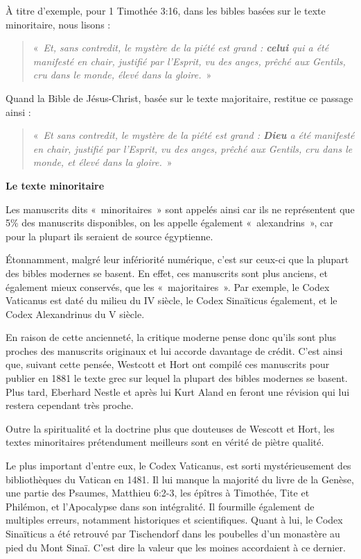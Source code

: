 \begin{small}
À titre d'exemple, pour 1 Timothée 3:16, dans les bibles basées sur le texte minoritaire, nous lisons :
\begin{quote}
«~\emph{Et, sans contredit, le mystère de la piété est grand : \textbf{celui} qui a été manifesté en chair, justifié par l'Esprit, vu des anges, prêché aux Gentils, cru dans le monde, élevé dans la gloire.}~»
\end{quote}

Quand la Bible de Jésus-Christ, basée sur le texte majoritaire, restitue ce passage ainsi :
\begin{quote}
«~\emph{Et sans contredit, le mystère de la piété est grand : \textbf{Dieu} a été manifesté en chair, justifié par l'Esprit, vu des anges, prêché aux Gentils, cru dans le monde, et élevé dans la gloire.}~»\newline
\end{quote}

\textbf{Le texte minoritaire}\bigskip

Les manuscrits dits «~minoritaires~» sont appelés ainsi car ils ne représentent que 5\% des manuscrits disponibles, on les appelle également «~alexandrins~», car pour la plupart ils seraient de source égyptienne.\bigskip

Étonnamment, malgré leur infériorité numérique, c'est sur ceux-ci que la plupart des bibles modernes se basent. En effet, ces manuscrits sont plus anciens, et également mieux conservés, que les «~majoritaires~». Par exemple, le Codex Vaticanus est daté du milieu du IV siècle, le Codex Sinaïticus également, et le Codex Alexandrinus du V siècle.\bigskip

En raison de cette ancienneté, la critique moderne pense donc qu'ils sont plus proches des manuscrits originaux et lui accorde davantage de crédit. C'est ainsi que, suivant cette pensée, Westcott et Hort ont compilé ces manuscrits pour publier en 1881 le texte grec sur lequel la plupart des bibles modernes se basent. Plus tard, Eberhard Nestle et après lui Kurt Aland en feront une révision qui lui restera cependant très proche.\bigskip

Outre la spiritualité et la doctrine plus que douteuses de Wescott et Hort, les textes minoritaires prétendument meilleurs sont en vérité de piètre qualité.\bigskip

Le plus important d'entre eux, le Codex Vaticanus, est sorti mystérieusement des bibliothèques du Vatican en 1481. Il lui manque la majorité du livre de la Genèse, une partie des Psaumes, Matthieu 6:2-3, les épîtres à Timothée, Tite et Philémon, et l'Apocalypse dans son intégralité. Il fourmille également de multiples erreurs, notamment historiques et scientifiques. Quant à lui, le Codex Sinaïticus a été retrouvé par Tischendorf dans les poubelles d'un monastère au pied du Mont Sinaï. C'est dire la valeur que les moines accordaient à ce dernier.\bigskip


\end{small}
